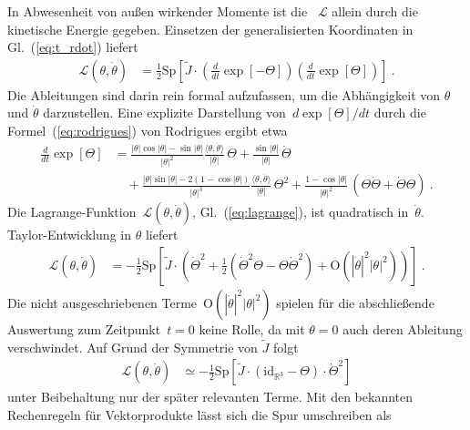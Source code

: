 \documentclass[10pt,a4paper]{article}
\newcommand{\mydef}[1]{\textls{#1}}
\begin{document}
In Abwesenheit von außen wirkender Momente ist die \mydef{Lagrange-Funktion}~$\mathcal{L}$ allein durch die kinetische Energie gegeben.
Einsetzen der generalisierten Koordinaten in Gl.~(\ref{eq:t_rdot}) liefert
\begin{align}
\label{eq:lagrange}
	\mathcal{L}(\theta, \dot{\theta})
	&=
	\frac{1}{2}
	\mathrm{Sp}\left[
		\tilde{J}
		\cdot
		\left(
			\frac{d}{dt}
			\exp[-\Theta]
		\right)		
		\left(
			\frac{d}{dt}
			\exp[\Theta]
		\right)	
	\right]
	\ .
\end{align}
Die Ableitungen sind darin rein formal aufzufassen, um die Abhängigkeit von $\theta$ und $\dot{\theta}$ darzustellen.
Eine explizite Darstellung von~$d\exp[\Theta]/dt$ durch die Formel~(\ref{eq:rodrigues}) von Rodrigues ergibt etwa
\begin{align}
	\frac{d}{dt}
	\exp[\Theta]
	&= 
	\frac{|\theta|\cos|\theta|-\sin|\theta|}{|\theta|^2}
	\frac{\langle
		\theta,\dot{\theta}
	\rangle}{|\theta|}
	\,\Theta
	+ \frac{\sin|\theta|}{|\theta|}\,\dot{\Theta}
	\nonumber\\
	&\quad
	+ \frac{|\theta|\sin|\theta|-2(1 - \cos|\theta|)}{|\theta|^3}
	\frac{\langle
		\theta,\dot{\theta}
	\rangle}{|\theta|}\,\Theta^2
	+ \frac{1 - \cos|\theta|}{|\theta|^2}\,
	\left(
		\Theta\dot{\Theta} + \dot{\Theta}\Theta
	\right)
	\ .
\end{align}
Die Lagrange-Funktion~$\mathcal{L}(\theta, \dot{\theta})$, Gl.~(\ref{eq:lagrange}), ist quadratisch in~$\dot{\theta}$.
Taylor-Entwicklung in $\theta$ liefert
\begin{align}
	\mathcal{L}(\theta, \dot{\theta})
	&=
	-\frac{1}{2}
	\mathrm{Sp}\left[
		\tilde{J}
		\cdot
		\left(
			\dot{\Theta}^2
			+ \frac{1}{2}
			\left(
				\dot{\Theta}^2\Theta
				-
				\Theta\dot{\Theta}^2
			\right)
			+ \mathrm{O}(|\dot{\theta}|^2|\theta|^2)
		\right)	
	\right]
	\ .
\end{align}
Die nicht ausgeschriebenen Terme~$\mathrm{O}(|\dot{\theta}|^2|\theta|^2)$ spielen für die abschließende Auswertung zum Zeitpunkt~$t=0$ keine Rolle, da mit $\theta=0$ auch deren Ableitung verschwindet.
Auf Grund der Symmetrie von $\tilde{J}$ folgt
\begin{align}
\label{eq:lagrange_approx}
	\mathcal{L}(\theta, \dot{\theta})
	&\simeq
	-\frac{1}{2}
	\mathrm{Sp}\left[
		\tilde{J}
		\cdot
		\left(
			\mathrm{id}_{\mathbb{R}^3}
			-
			\Theta
		\right)
		\cdot
		\dot{\Theta}^2
	\right]
\end{align}
unter Beibehaltung nur der später relevanten Terme.
Mit den bekannten Rechenregeln für Vektorprodukte lässt sich die Spur umschreiben als
\end{document}
